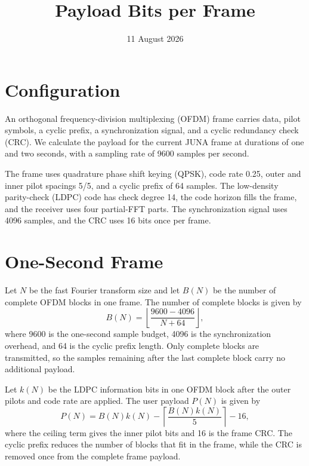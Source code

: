 \documentclass[11pt]{article}
\title{Payload Bits per Frame}
\author{}
\date{11 August 2026}
\begin{document}
\maketitle

\section{Configuration}

An orthogonal frequency-division multiplexing (OFDM) frame carries data,
pilot symbols, a cyclic prefix, a synchronization signal, and a cyclic
redundancy check (CRC).  We calculate the payload for the current JUNA frame
at durations of one and two seconds, with a sampling rate of 9600 samples per
second.

The frame uses quadrature phase shift keying (QPSK), code rate 0.25, outer
and inner pilot spacings 5/5, and a cyclic prefix of 64 samples.  The
low-density parity-check (LDPC) code has check degree 14, the code horizon
fills the frame, and the receiver uses four partial-FFT parts.  The
synchronization signal uses 4096 samples, and the CRC uses 16 bits once per
frame.

\section{One-Second Frame}

Let $N$ be the fast Fourier transform size and let $B(N)$ be the number of
complete OFDM blocks in one frame.  The number of complete blocks is given by
\begin{equation}
  B(N)
  =
  \left\lfloor\frac{9600-4096}{N+64}\right\rfloor,
  \label{eq:blocks}
\end{equation}
where 9600 is the one-second sample budget, 4096 is the synchronization
overhead, and 64 is the cyclic prefix length.  Only complete blocks are
transmitted, so the samples remaining after the last complete block carry no
additional payload.

Let $k(N)$ be the LDPC information bits in one OFDM block after the outer
pilots and code rate are applied.  The user payload $P(N)$ is given by
\begin{equation}
  P(N)
  =
  B(N)k(N)
  -\left\lceil\frac{B(N)k(N)}{5}\right\rceil
  -16,
  \label{eq:payload}
\end{equation}
where the ceiling term gives the inner pilot bits and 16 is the frame CRC.
The cyclic prefix reduces the number of blocks that fit in the frame, while
the CRC is removed once from the complete frame payload.
\end{document}
